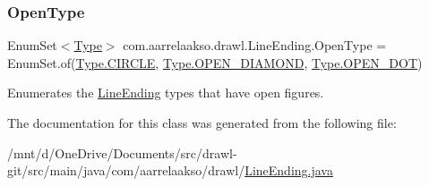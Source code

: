 \subsubsection{\texorpdfstring{Open\+Type}{OpenType}}
{\footnotesize\ttfamily Enum\+Set$<$\hyperlink{enumcom_1_1aarrelaakso_1_1drawl_1_1_line_ending_1_1_type}{Type}$>$ com.\+aarrelaakso.\+drawl.\+Line\+Ending.\+Open\+Type = Enum\+Set.\+of(\hyperlink{enumcom_1_1aarrelaakso_1_1drawl_1_1_line_ending_1_1_type_af07aa0aa4f1de58f3eb19da4f8fc4ba2}{Type.\+C\+I\+R\+C\+LE}, \hyperlink{enumcom_1_1aarrelaakso_1_1drawl_1_1_line_ending_1_1_type_a13f6d6fbec0c37e1b87096ceb067ee6b}{Type.\+O\+P\+E\+N\+\_\+\+D\+I\+A\+M\+O\+ND}, \hyperlink{enumcom_1_1aarrelaakso_1_1drawl_1_1_line_ending_1_1_type_a4c9d73e9e0f20637712c6a8183742eee}{Type.\+O\+P\+E\+N\+\_\+\+D\+OT})\hspace{0.3cm}{\ttfamily [static]}}



Enumerates the \hyperlink{classcom_1_1aarrelaakso_1_1drawl_1_1_line_ending}{Line\+Ending} types that have open figures. 



The documentation for this class was generated from the following file\+:\begin{DoxyCompactItemize}
\item 
/mnt/d/\+One\+Drive/\+Documents/src/drawl-\/git/src/main/java/com/aarrelaakso/drawl/\hyperlink{_line_ending_8java}{Line\+Ending.\+java}\end{DoxyCompactItemize}
